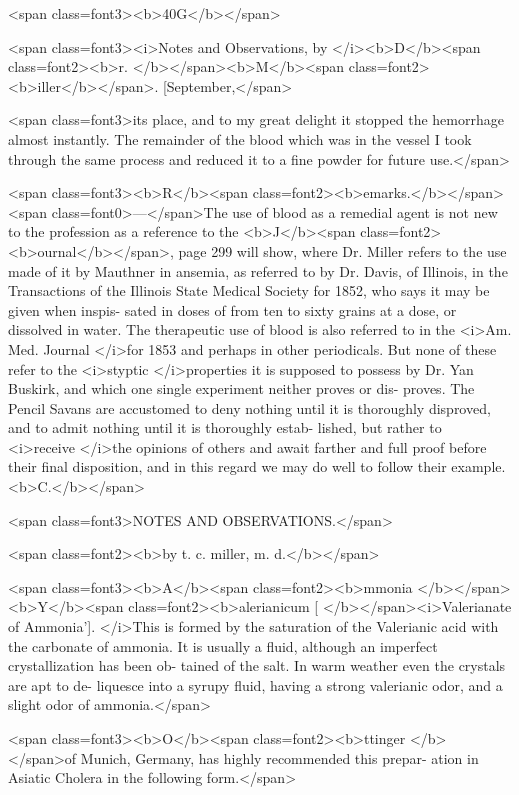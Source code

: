 <span class=font3><b>40G</b></span>

<span class=font3><i>Notes and Observations, by </i><b>D</b><span class=font2><b>r. </b></span><b>M</b><span class=font2><b>iller</b></span>. [September,</span>

<span class=font3>its place, and to my great delight it stopped the hemorrhage almost
instantly. The remainder of the blood which was in the vessel I took
through the same process and reduced it to a fine powder for future use.</span>

<span class=font3><b>R</b><span class=font2><b>emarks.</b></span><span class=font0>—</span>The use of blood as a remedial agent is not new to the
profession as a reference to the <b>J</b><span class=font2><b>ournal</b></span>, page 299 will show, where
Dr. Miller refers to the use made of it by Mauthner in ansemia, as
referred to by Dr. Davis, of Illinois, in the Transactions of the Illinois
State Medical Society for 1852, who says it may be given when inspis-
sated in doses of from ten to sixty grains at a dose, or dissolved in
water. The therapeutic use of blood is also referred to in the <i>Am.
Med. Journal </i>for 1853 and perhaps in other periodicals. But none of
these refer to the <i>styptic </i>properties it is supposed to possess by Dr.
Yan Buskirk, and which one single experiment neither proves or dis-
proves. The Pencil Savans are accustomed to deny nothing until it is
thoroughly disproved, and to admit nothing until it is thoroughly estab-
lished, but rather to <i>receive </i>the opinions of others and await farther
and full proof before their final disposition, and in this regard we may
do well to follow their example. <b>C.</b></span>

<span class=font3>NOTES AND OBSERVATIONS.</span>

<span class=font2><b>by t. c. miller, m. d.</b></span>

<span class=font3><b>A</b><span class=font2><b>mmonia </b></span><b>Y</b><span class=font2><b>alerianicum [ </b></span><i>Valerianate of Ammonia']. </i>This is formed
by the saturation of the Valerianic acid with the carbonate of ammonia.
It is usually a fluid, although an imperfect crystallization has been ob-
tained of the salt. In warm weather even the crystals are apt to de-
liquesce into a syrupy fluid, having a strong valerianic odor, and a
slight odor of ammonia.</span>

<span class=font3><b>O</b><span class=font2><b>ttinger </b></span>of Munich, Germany, has highly recommended this prepar-
ation in Asiatic Cholera in the following form.</span>

